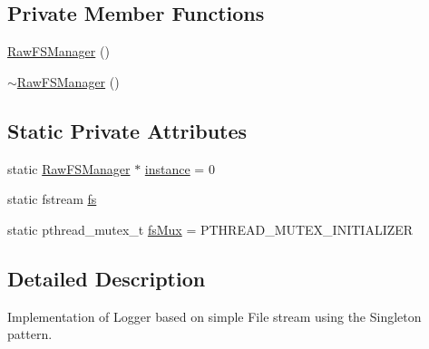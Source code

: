 \subsection*{Private Member Functions}
\begin{DoxyCompactItemize}
\item 
\hyperlink{classit_1_1testbench_1_1ioutil_1_1RawFSManager_acbffda7f5db0b9ee25ca38a3154cf63e}{Raw\-F\-S\-Manager} ()
\item 
\hyperlink{classit_1_1testbench_1_1ioutil_1_1RawFSManager_aff20e5a12c6c3dff1d83a8a3258e66b5}{$\sim$\-Raw\-F\-S\-Manager} ()
\end{DoxyCompactItemize}
\subsection*{Static Private Attributes}
\begin{DoxyCompactItemize}
\item 
static \hyperlink{classit_1_1testbench_1_1ioutil_1_1RawFSManager}{Raw\-F\-S\-Manager} $\ast$ \hyperlink{classit_1_1testbench_1_1ioutil_1_1RawFSManager_a80c0fcfb712921e4f05703ce1ecf99f2}{instance} = 0
\item 
static fstream \hyperlink{classit_1_1testbench_1_1ioutil_1_1RawFSManager_a413121e26e9462f50b44d9709ab41914}{fs}
\item 
static pthread\-\_\-mutex\-\_\-t \hyperlink{classit_1_1testbench_1_1ioutil_1_1RawFSManager_a3011d242d4bdc600bad7d57f94801e73}{fs\-Mux} = P\-T\-H\-R\-E\-A\-D\-\_\-\-M\-U\-T\-E\-X\-\_\-\-I\-N\-I\-T\-I\-A\-L\-I\-Z\-E\-R
\end{DoxyCompactItemize}


\subsection{Detailed Description}
Implementation of Logger based on simple File stream using the Singleton pattern. 

